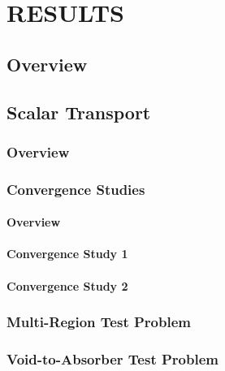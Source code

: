 \chapter{RESULTS}

\section{Overview}
  
\section{Scalar Transport\label{sec:transport_results}}
\subsection{Overview\label{sec:scalar_overview}}
  
\subsection{Convergence Studies\label{sec:convergence}}
  \subsubsection{Overview\label{sec:convergence_overview}}
    
  \subsubsection{Convergence Study 1\label{sec:mms_sinx_ss}}
    
  \subsubsection{Convergence Study 2\label{sec:absorber_ss}}
    
\subsection{Multi-Region Test Problem\label{sec:multi_region}}
  
\subsection{Void-to-Absorber Test Problem\label{sec:void_to_absorber}}
  
